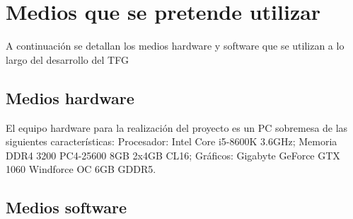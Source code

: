 \documentclass[11pt,a4paper,twoside,final]{article}
\begin{document}
\newpage
\section{Medios que se pretende utilizar}
A continuación se detallan los medios hardware y software que se utilizan a lo largo del desarrollo del TFG

\subsection{Medios hardware}
El equipo hardware para la realización del proyecto es un PC sobremesa de las siguientes características:
 Procesador: Intel Core i5-8600K 3.6GHz; Memoria DDR4 3200 PC4-25600 8GB 2x4GB CL16; Gráficos: Gigabyte
 GeForce GTX 1060 Windforce OC 6GB GDDR5.
\subsection{Medios software}
\end{document}
